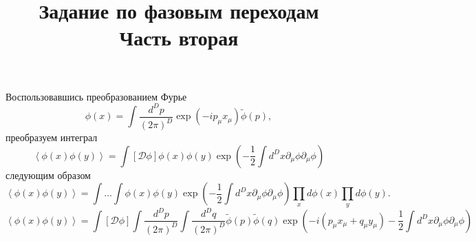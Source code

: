 \documentclass[a4paper]{article}
\title{Задание по фазовым переходам\\Часть вторая}
\begin{document}
	\maketitle
Воспользовавшись преобразованием Фурье
\[
	\phi(x)= \int \frac{d^Dp}{(2\pi)^D}\exp(-ip_\mu x_\mu)
	\tilde{\phi}(p)
 ,\]
преобразуем интеграл
\[
	\left<\phi(x)\phi(y) \right> =  \int [\mathcal{D}\phi
	]\phi(x)\phi(y) \exp \left( -\frac{1}{2}\int
	d^Dx \partial_\mu \phi \partial_\mu \phi\right) 
\] 
следующим образом
\[
	\left<\phi(x)\phi(y) \right> =
	\int \ldots \int \phi(x)\phi(y) \exp\left( -\frac{1}{2}
	\int d^D x \partial_\mu \phi \partial_\mu \phi\right)  \prod_{x}^{}d\phi(x) \prod_{y}^{}  d\phi(y) 
.\] 
\[
	\left<\phi(x)\phi(y) \right> =  \int [\mathcal{D}\phi
	]\int \frac{d^Dp}{(2\pi)^D}\int \frac{d^Dq}{(2\pi)^D}\tilde{\phi}(p) \tilde{\phi}(q) \exp \left(-i(p_\mu x_\mu+ q_\mu y_\mu) -\frac{1}{2}\int
	d^Dx \partial_\mu \phi \partial_\mu \phi\right) 
\]
\end{document}
